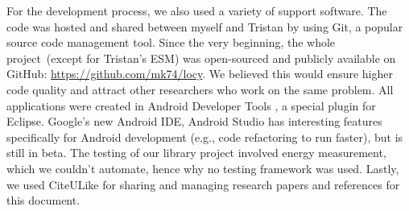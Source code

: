 For the development process, we also used a variety of support software. The code was hosted and shared between myself and Tristan by using Git, a popular source code management tool. Since the very beginning, the whole project\ (except for Tristan's ESM) was open-sourced and publicly available on GitHub: \url{https://github.com/mk74/locy}. We believed this would ensure higher code quality and attract other researchers who work on the same problem. All applications were created in Android Developer Tools \cite{google:adt}, a special plugin for Eclipse. Google's new Android IDE, Android Studio \cite{google:androidstudio} has interesting features specifically for Android development (e.g., code refactoring to run faster), but is still in beta. The testing of our library project involved energy measurement, which we couldn't automate, hence why no testing framework was used. Lastly, we used CiteULike for sharing and managing research papers and references for this document.
	
